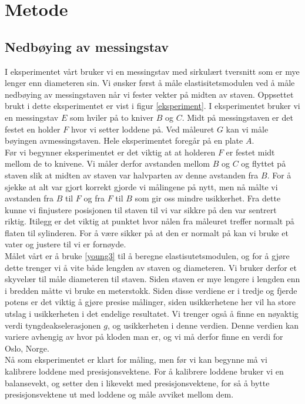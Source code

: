 \documentclass[%
 reprint,
 amsmath,amssymb,
 aps,
 norsk,
 booktabs
]{revtex4-1}
\begin{document}
\section{Metode}
\subsection{Nedbøying av messingstav}
I eksperimentet vårt bruker vi en messingstav med sirkulært tversnitt som er mye lenger enn diameteren sin. Vi ønsker først å måle elastisitetsmodulen ved å måle nedbøying av messingstaven når vi fester vekter på midten av staven. Oppsettet brukt i dette eksperimentet er vist i figur \vref{eksperiment}. I eksperimentet bruker vi en messingstav $E$ som hviler på to kniver $B$ og $C$. Midt på messingstaven er det festet en holder $F$ hvor vi setter loddene på. Ved måleuret $G$ kan vi måle bøyingen avmessingstaven. Hele eksperimentet foregår på en plate $A$.\\
Før vi begynner eksperimentet er det viktig at at holderen $F$ er festet midt mellom de to knivene. Vi måler derfor avstanden mellom $B$ og $C$ og flyttet på staven slik at midten av staven var halvparten av denne avstanden fra $B$. For å sjekke at alt var gjort korrekt gjorde vi målingene på nytt, men nå målte vi avstanden fra $B$ til $F$ og fra $F$ til $B$ som gir oss mindre usikkerhet. Fra dette kunne vi finjustere posisjonen til staven til vi var sikkre på den var sentrert riktig. Itilegg er det viktig at punktet hvor nålen fra måleuret treffer normalt på flaten til sylinderen. For å være sikker på at den er normalt på kan vi bruke et vater og justere til vi er fornøyde.\\
Målet vårt er å bruke \eqref{young3} til å beregne elastisutetsmodulen, og for å gjøre dette trenger vi å vite både lengden av staven og diameteren. Vi bruker derfor et skyvelær til måle diameteren til staven. Siden staven er mye lengere i lengden enn i bredden måtte vi bruke en meterstokk. Siden disse verdiene er i tredje og fjerde potens er det viktig å gjøre presise målinger, siden usikkerhetene her vil ha store utslag i usikkerheten i det endelige resultatet. Vi trenger også å finne en nøyaktig verdi tyngdeakselerasjonen $g$, og usikkerheten i denne verdien. Denne verdien kan variere avhengig av hvor på kloden man er, og vi må derfor finne en verdi for Oslo, Norge. \\
Nå som eksperimentet er klart for måling, men før vi kan begynne må vi kalibrere loddene med presisjonsvektene. For å kalibrere loddene bruker vi en balansevekt, og setter den i likevekt med presisjonsvektene, for så å bytte presisjonsvektene ut med loddene og måle avviket mellom dem.
\end{document}
